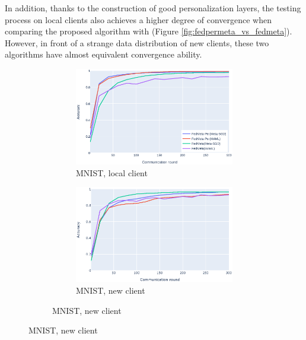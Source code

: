 \documentclass[runningheads]{llncs}
\begin{document}
In addition, thanks to the construction of good personalization layers, the testing process on local clients also achieves a higher degree of convergence when comparing the proposed algorithm with  (Figure \ref{fig:fedpermeta_vs_fedmeta}). However, in front of a strange data distribution of new clients, these two algorithms have almost equivalent convergence ability.

\begin{figure}[h]
    \centering
    \begin{subfigure}{\textwidth}
        \centering
        \begin{subfigure}{.49\textwidth}
            \includegraphics[width=\linewidth]{img/mnist_old_metaper.eps}
            \caption{MNIST, local client}\label{mnist_old_metaper}
        \end{subfigure}
        \begin{subfigure}{.49\textwidth}
            \includegraphics[width=\linewidth]{img/mnist_new_metaper.eps}
            \caption{MNIST, new client}\label{mnist_new_metaper}

\end{subfigure}
\end{subfigure}
\end{figure}
\end{document}

